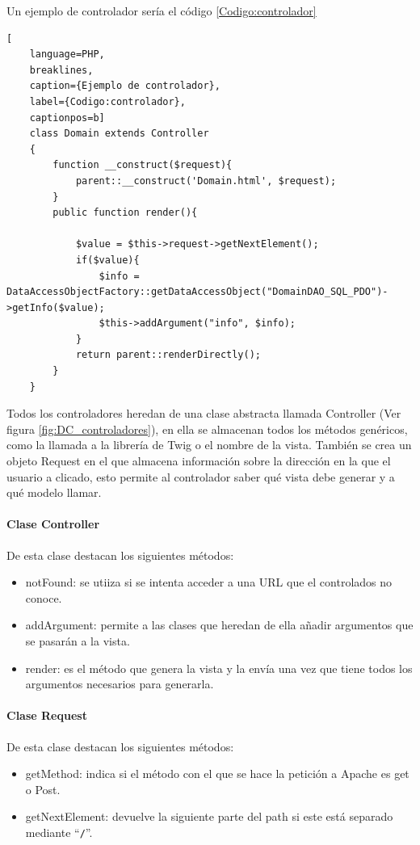Un ejemplo de controlador sería el código \ref{Codigo:controlador}

\begin{lstlisting}[
    language=PHP,
    breaklines, 
    caption={Ejemplo de controlador}, 
    label={Codigo:controlador}, 
    captionpos=b]
    class Domain extends Controller
    {	
        function __construct($request){
            parent::__construct('Domain.html', $request);
        }
        public function render(){

            $value = $this->request->getNextElement();
            if($value){
                $info = DataAccessObjectFactory::getDataAccessObject("DomainDAO_SQL_PDO")->getInfo($value);
                $this->addArgument("info", $info);
            }
            return parent::renderDirectly();
        }
    }
\end{lstlisting}

Todos los controladores heredan de una clase abstracta llamada Controller (Ver figura \ref{fig:DC_controladores}), en ella se almacenan todos los métodos genéricos, como la llamada a la librería de Twig o el nombre de la vista. También se crea un objeto Request en el que almacena información sobre la dirección en la que el usuario a clicado, esto permite al controlador saber qué vista debe generar y a qué modelo llamar. 

\paragraph{Clase Controller}
De esta clase destacan los siguientes métodos: 
\begin{itemize}
    \item notFound: se utiiza si se intenta acceder a una URL que el controlados no conoce. 
    \item addArgument: permite a las clases que heredan de ella añadir argumentos que se pasarán a la vista.
    \item render: es el método que genera la vista y la envía una vez que tiene todos los argumentos necesarios para generarla. 
\end{itemize}

\paragraph{Clase Request}
De esta clase destacan los siguientes métodos: 
\begin{itemize}
    \item getMethod: indica si el método con el que se hace la petición a Apache es get o Post.
    \item getNextElement: devuelve la siguiente parte del path si este está separado mediante ``\verb!/!''.
\end{itemize}

